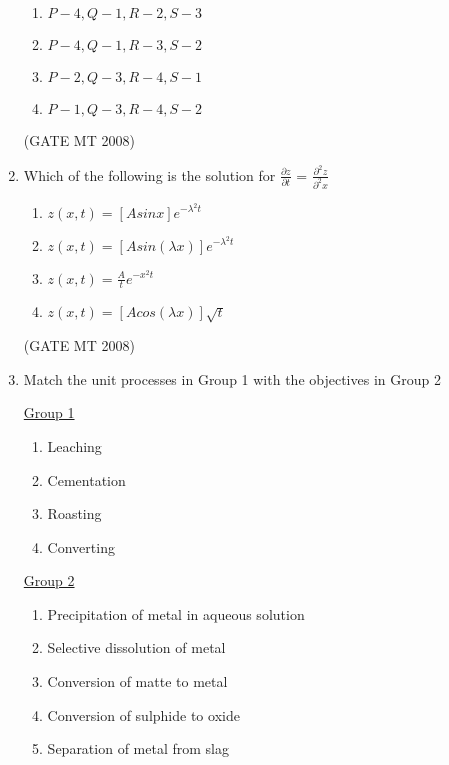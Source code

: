 \documentclass[journal, 11pt, onecolumn]{IEEEtran}
\theoremstyle{remark}
\begin{document}
\begin{enumerate}
\begin{multicols}{2}
\begin{enumerate}
\item $P-4, Q-1, R-2, S-3$
\item $P-4, Q-1, R-3, S-2$
\item $P-2, Q-3, R-4, S-1$
\item $P-1, Q-3, R-4, S-2$
\end{enumerate}
\end{multicols}

\hfill(GATE MT 2008)

\item Which of the following is the solution for {\LARGE $\frac{\partial z}{\partial t}$ = $\frac{\partial^2z}{\partial^2x}$}

\begin{multicols}{2}
\begin{enumerate}
\item {\large$z(x,t)= [Asinx]$$e^{-\lambda^2 t}$}
\item {\large$z(x,t)= [Asin(\lambda x)]$$e^{-\lambda^2 t}$} 
\item {\large$z(x,t)=\frac{A}{t}$$e^{-x^2 t}$}
\item {\large$z(x,t)= [Acos(\lambda x)]$$\sqrt{t}$}
\end{enumerate}
\end{multicols}

\hfill(GATE MT 2008)

\item Match the unit processes in Group 1 with the objectives in Group 2
\begin{multicols}{2}
\underline{Group 1}
\begin{enumerate}[label=(\Alph*), start=16]
\item Leaching
\item Cementation
\item Roasting
\item Converting
\end{enumerate}

\underline{Group 2}
\begin{enumerate}[label=(\arabic*), start=1]
\item Precipitation of metal in aqueous solution
\item Selective dissolution of metal
\item Conversion of matte to metal
\item Conversion of sulphide to oxide 
\item Separation of metal from slag
\end{enumerate}
\end{multicols}


\end{enumerate}
\end{document}
